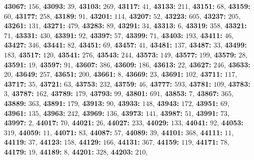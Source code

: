 \textsf{\bfseries 43067:} $156$, \textsf{\bfseries 43093:} $39$, \textsf{\bfseries 43103:} $269$, \textsf{\bfseries 43117:} $41$, \textsf{\bfseries 43133:} $211$, \textsf{\bfseries 43151:} $68$, \textsf{\bfseries 43159:} $60$, \textsf{\bfseries 43177:} $258$, \textsf{\bfseries 43189:} $91$, \textsf{\bfseries 43201:} $114$, \textsf{\bfseries 43207:} $52$, \textsf{\bfseries 43223:} $605$, \textsf{\bfseries 43237:} $205$, \textsf{\bfseries 43261:} $131$, \textsf{\bfseries 43271:} $479$, \textsf{\bfseries 43283:} $89$, \textsf{\bfseries 43291:} $34$, \textsf{\bfseries 43313:} $6$, \textsf{\bfseries 43319:} $358$, \textsf{\bfseries 43321:} $71$, \textsf{\bfseries 43331:} $430$, \textsf{\bfseries 43391:} $92$, \textsf{\bfseries 43397:} $57$, \textsf{\bfseries 43399:} $71$, \textsf{\bfseries 43403:} $193$, \textsf{\bfseries 43411:} $46$, \textsf{\bfseries 43427:} $346$, \textsf{\bfseries 43441:} $82$, \textsf{\bfseries 43451:} $69$, \textsf{\bfseries 43457:} $41$, \textsf{\bfseries 43481:} $137$, \textsf{\bfseries 43487:} $33$, \textsf{\bfseries 43499:} $183$, \textsf{\bfseries 43517:} $120$, \textsf{\bfseries 43541:} $276$, \textsf{\bfseries 43543:} $244$, \textsf{\bfseries 43573:} $149$, \textsf{\bfseries 43577:} $199$, \textsf{\bfseries 43579:} $28$, \textsf{\bfseries 43591:} $19$, \textsf{\bfseries 43597:} $91$, \textsf{\bfseries 43607:} $386$, \textsf{\bfseries 43609:} $186$, \textsf{\bfseries 43613:} $22$, \textsf{\bfseries 43627:} $246$, \textsf{\bfseries 43633:} $20$, \textsf{\bfseries 43649:} $257$, \textsf{\bfseries 43651:} $200$, \textsf{\bfseries 43661:} $8$, \textsf{\bfseries 43669:} $23$, \textsf{\bfseries 43691:} $102$, \textsf{\bfseries 43711:} $117$, \textsf{\bfseries 43717:} $35$, \textsf{\bfseries 43721:} $63$, \textsf{\bfseries 43753:} $232$, \textsf{\bfseries 43759:} $46$, \textsf{\bfseries 43777:} $593$, \textsf{\bfseries 43781:} $109$, \textsf{\bfseries 43783:} $3$, \textsf{\bfseries 43787:} $162$, \textsf{\bfseries 43789:} $179$, \textsf{\bfseries 43793:} $99$, \textsf{\bfseries 43801:} $691$, \textsf{\bfseries 43853:} $7$, \textsf{\bfseries 43867:} $365$, \textsf{\bfseries 43889:} $363$, \textsf{\bfseries 43891:} $179$, \textsf{\bfseries 43913:} $90$, \textsf{\bfseries 43933:} $148$, \textsf{\bfseries 43943:} $172$, \textsf{\bfseries 43951:} $69$, \textsf{\bfseries 43961:} $135$, \textsf{\bfseries 43963:} $242$, \textsf{\bfseries 43969:} $136$, \textsf{\bfseries 43973:} $141$, \textsf{\bfseries 43987:} $51$, \textsf{\bfseries 43991:} $73$, \textsf{\bfseries 43997:} $2$, \textsf{\bfseries 44017:} $70$, \textsf{\bfseries 44021:} $26$, \textsf{\bfseries 44027:} $233$, \textsf{\bfseries 44029:} $133$, \textsf{\bfseries 44041:} $92$, \textsf{\bfseries 44053:} $319$, \textsf{\bfseries 44059:} $11$, \textsf{\bfseries 44071:} $83$, \textsf{\bfseries 44087:} $57$, \textsf{\bfseries 44089:} $39$, \textsf{\bfseries 44101:} $368$, \textsf{\bfseries 44111:} $11$, \textsf{\bfseries 44119:} $37$, \textsf{\bfseries 44123:} $158$, \textsf{\bfseries 44129:} $166$, \textsf{\bfseries 44131:} $367$, \textsf{\bfseries 44159:} $119$, \textsf{\bfseries 44171:} $78$, \textsf{\bfseries 44179:} $19$, \textsf{\bfseries 44189:} $8$, \textsf{\bfseries 44201:} $328$, \textsf{\bfseries 44203:} $210$, 
